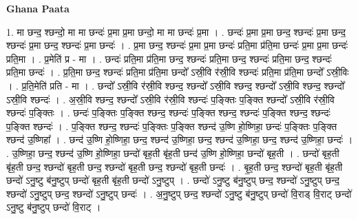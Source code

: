 \documentclass[17pt]{extarticle}
\begin{document}
\textbf{Ghana Paata } \newline

1. मा छन्द॒ श्छन्दो॒ मा मा छन्दः॑ प्र॒मा प्र॒मा छन्दो॒ मा मा छन्दः॑ प्र॒मा । . छन्दः॑ प्र॒मा प्र॒मा छन्द॒ श्छन्दः॑ प्र॒मा छन्द॒ श्छन्दः॑ प्र॒मा छन्द॒ श्छन्दः॑ प्र॒मा छन्दः॑ । . प्र॒मा छन्द॒ श्छन्दः॑ प्र॒मा प्र॒मा छन्दः॑ प्रति॒मा प्र॑ति॒मा छन्दः॑ प्र॒मा प्र॒मा छन्दः॑ प्रति॒मा । . प्र॒मेति॑ प्र - मा । . छन्दः॑ प्रति॒मा प्र॑ति॒मा छन्द॒ श्छन्दः॑ प्रति॒मा छन्द॒ श्छन्दः॑ प्रति॒मा छन्द॒ श्छन्दः॑ प्रति॒मा छन्दः॑ । . प्र॒ति॒मा छन्द॒ श्छन्दः॑ प्रति॒मा प्र॑ति॒मा छन्दो᳚ ऽस्री॒वि र॑स्री॒वि श्छन्दः॑ प्रति॒मा प्र॑ति॒मा छन्दो᳚ ऽस्री॒विः । . प्र॒ति॒मेति॑ प्रति - मा । . छन्दो᳚ ऽस्री॒वि र॑स्री॒वि श्छन्द॒ श्छन्दो᳚ ऽस्री॒वि श्छन्द॒ श्छन्दो᳚ ऽस्री॒वि श्छन्द॒ श्छन्दो᳚ ऽस्री॒वि श्छन्दः॑ । . अ॒स्री॒वि श्छन्द॒ श्छन्दो᳚ ऽस्री॒वि र॑स्री॒वि श्छन्दः॑ प॒ङ्क्तिः प॒ङ्क्ति श्छन्दो᳚ ऽस्री॒वि र॑स्री॒वि श्छन्दः॑ प॒ङ्क्तिः । . छन्दः॑ प॒ङ्क्तिः प॒ङ्क्ति श्छन्द॒ श्छन्दः॑ प॒ङ्क्ति श्छन्द॒ श्छन्दः॑ प॒ङ्क्ति श्छन्द॒ श्छन्दः॑ प॒ङ्क्ति श्छन्दः॑ । . प॒ङ्क्ति श्छन्द॒ श्छन्दः॑ प॒ङ्क्तिः प॒ङ्क्ति श्छन्द॑ उ॒ष्णि हो॒ष्णिहा॒ छन्दः॑ प॒ङ्क्तिः प॒ङ्क्ति श्छन्द॑ उ॒ष्णिहा᳚ । . छन्द॑ उ॒ष्णि हो॒ष्णिहा॒ छन्द॒ श्छन्द॑ उ॒ष्णिहा॒ छन्द॒ श्छन्द॑ उ॒ष्णिहा॒ छन्द॒ श्छन्द॑ उ॒ष्णिहा॒ छन्दः॑ । . उ॒ष्णिहा॒ छन्द॒ श्छन्द॑ उ॒ष्णि हो॒ष्णिहा॒ छन्दो॑ बृह॒ती बृ॑ह॒ती छन्द॑ उ॒ष्णि हो॒ष्णिहा॒ छन्दो॑ बृह॒ती । . छन्दो॑ बृह॒ती बृ॑ह॒ती छन्द॒ श्छन्दो॑ बृह॒ती छन्द॒ श्छन्दो॑ बृह॒ती छन्द॒ श्छन्दो॑ बृह॒ती छन्दः॑ । . बृ॒ह॒ती छन्द॒ श्छन्दो॑ बृह॒ती बृ॑ह॒ती छन्दो॑ ऽनु॒ष्टु ब॑नु॒ष्टुप् छन्दो॑ बृह॒ती बृ॑ह॒ती छन्दो॑ ऽनु॒ष्टुप् । . छन्दो॑ ऽनु॒ष्टु ब॑नु॒ष्टुप् छन्द॒ श्छन्दो॑ ऽनु॒ष्टुप् छन्द॒ श्छन्दो॑ ऽनु॒ष्टुप् छन्द॒ श्छन्दो॑ ऽनु॒ष्टुप् छन्दः॑ । . अ॒नु॒ष्टुप् छन्द॒ श्छन्दो॑ ऽनु॒ष्टु ब॑नु॒ष्टुप् छन्दो॑ वि॒राड् वि॒राट् छन्दो॑ ऽनु॒ष्टु ब॑नु॒ष्टुप् छन्दो॑ वि॒राट् । \newline
\end{document}
